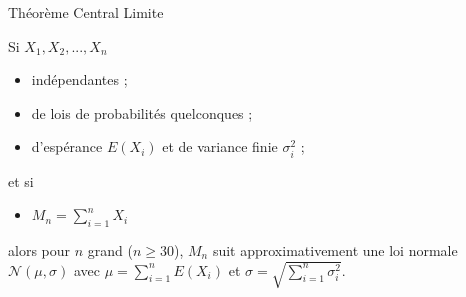 \documentclass{beamer}
\begin{document}
\begin{frame}{Théorème Central Limite}

Si $X_1, X_2, ..., X_n$ 
\begin{itemize}
\item indépendantes ;
\item de lois de probabilités quelconques ;
\item  d'espérance $E(X_i)$ et de variance finie $\sigma_i^2$ ;
\end{itemize}

et si 
\begin{itemize}
\item $M_n=\sum\limits_{i=1}^n X_i$
\end{itemize}
alors pour $n$ grand ($n\geq 30$), $M_n$ suit approximativement
une loi normale $\mathcal{N}(\mu,\sigma)$ avec $\mu = \sum\limits_{i=1}^n E(X_i)$ et
$\sigma = \sqrt{\sum\limits_{i=1}^n \sigma_i^2}$. 


\end{frame} 
 



\end{document}
